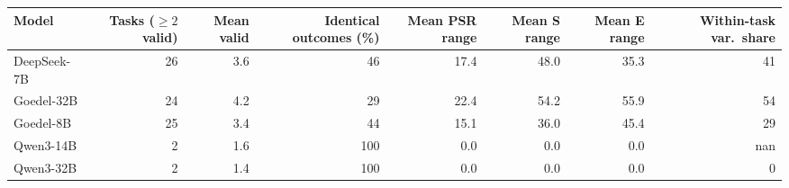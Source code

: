 \begin{tabular}{lrrrrrrr}
\toprule
Model & Tasks ($\ge 2$ valid) & Mean valid & Identical outcomes (\%) & Mean PSR range & Mean S range & Mean E range & Within-task var.\ share \\
\midrule
DeepSeek-7B & 26 & 3.6 & 46 & 17.4 & 48.0 & 35.3 & 41 \\
Goedel-32B & 24 & 4.2 & 29 & 22.4 & 54.2 & 55.9 & 54 \\
Goedel-8B & 25 & 3.4 & 44 & 15.1 & 36.0 & 45.4 & 29 \\
Qwen3-14B & 2 & 1.6 & 100 & 0.0 & 0.0 & 0.0 & nan \\
Qwen3-32B & 2 & 1.4 & 100 & 0.0 & 0.0 & 0.0 & 0 \\
\bottomrule
\end{tabular}
